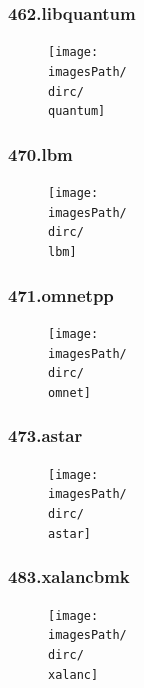 \documentclass[12pt,a4paper]{article}
\newcommand{\imagesPath}{/home/nick/arch-ntua/ex02/graphs}
\newcommand{\quantum}{462.libquantum.cslab_branch_predictors.out.pdf}
\newcommand{\lbm}{470.lbm.cslab_branch_predictors.out.pdf}
\newcommand{\omnet}{471.omnetpp.cslab_branch_predictors.out.pdf}
\newcommand{\astar}{473.astar.cslab_branch_predictors.out.pdf}
\newcommand{\xalanc}{483.xalancbmk.cslab_branch_predictors.out.pdf}
\newcommand{\dirc}{4.3}
\begin{document}
			\subsubsection{462.libquantum}
				\begin{figure}[H]
					\begin{center}
						 \texttt{[image: \\imagesPath/\\dirc/\\quantum]}
					\end{center}
				\end{figure}
			
			\subsubsection{470.lbm}
				\begin{figure}[H]
					\begin{center}
						 \texttt{[image: \\imagesPath/\\dirc/\\lbm]}
					\end{center}
				\end{figure}
			
			\subsubsection{471.omnetpp}
				\begin{figure}[H]
					\begin{center}
						 \texttt{[image: \\imagesPath/\\dirc/\\omnet]}
					\end{center}
				\end{figure}
			
			\subsubsection{473.astar}
				\begin{figure}[H]
					\begin{center}
						 \texttt{[image: \\imagesPath/\\dirc/\\astar]}
					\end{center}
				\end{figure}
			
			\subsubsection{483.xalancbmk}
				\begin{figure}[H]
					\begin{center}
						 \texttt{[image: \\imagesPath/\\dirc/\\xalanc]}
					\end{center}
				\end{figure}
			
\end{document}
